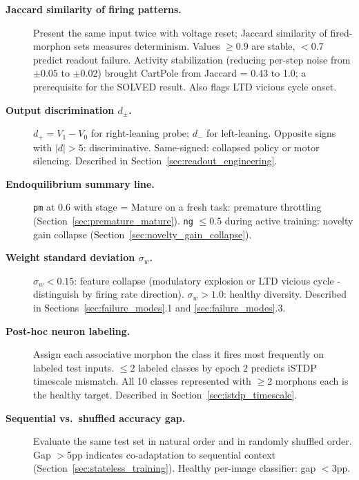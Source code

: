 \begin{description}
  \item[\textbf{Jaccard similarity of firing patterns.}] Present the same input twice with voltage reset; Jaccard similarity of fired-morphon sets measures determinism. Values $\geq 0.9$ are stable, $< 0.7$ predict readout failure. Activity stabilization (reducing per-step noise from $\pm 0.05$ to $\pm 0.02$) brought CartPole from Jaccard = 0.43 to 1.0; a prerequisite for the SOLVED result. Also flags LTD vicious cycle onset.
  \item[\textbf{Output discrimination $d_\pm$.}] $d_+ = V_1 - V_0$ for right-leaning probe; $d_-$ for left-leaning. Opposite signs with $|d| > 5$: discriminative. Same-signed: collapsed policy or motor silencing. Described in Section~\ref{sec:readout_engineering}.
  \item[\textbf{Endoquilibrium summary line.}] \texttt{pm} at 0.6 with stage = Mature on a fresh task: premature throttling (Section~\ref{sec:premature_mature}). \texttt{ng} $\leq 0.5$ during active training: novelty gain collapse (Section~\ref{sec:novelty_gain_collapse}).
  \item[\textbf{Weight standard deviation $\sigma_w$.}] $\sigma_w < 0.15$: feature collapse (modulatory explosion or LTD vicious cycle - distinguish by firing rate direction). $\sigma_w > 1.0$: healthy diversity. Described in Sections~\ref{sec:failure_modes}.1 and \ref{sec:failure_modes}.3.
  \item[\textbf{Post-hoc neuron labeling.}] Assign each associative morphon the class it fires most frequently on labeled test inputs. $\leq$2 labeled classes by epoch 2 predicts iSTDP timescale mismatch. All 10 classes represented with $\geq$2 morphons each is the healthy target. Described in Section~\ref{sec:istdp_timescale}.
  \item[\textbf{Sequential vs.\ shuffled accuracy gap.}] Evaluate the same test set in natural order and in randomly shuffled order. Gap $>$5pp indicates co-adaptation to sequential context (Section~\ref{sec:stateless_training}). Healthy per-image classifier: gap $<$3pp.
\end{description}

